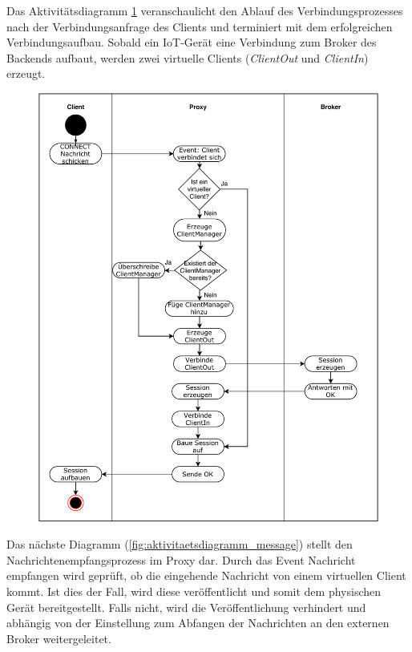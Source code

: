     Das Aktivitätsdiagramm \ref{fig:aktivitaetsdiagramm_connect} veranschaulicht den Ablauf des Verbindungsprozesses nach der Verbindungsanfrage des Clients und terminiert mit dem erfolgreichen Verbindungsaufbau.
    Sobald ein \ac{IoT}-Gerät eine Verbindung zum Broker des Backends aufbaut, werden zwei virtuelle Clients (\emph{ClientOut} und \emph{ClientIn}) erzeugt.
    
    \begin{figure}[!h]%
        \centering
        \includegraphics[width=14cm]{tex/bilder/4_konzept/Activity_Connect.pdf}
        \label{fig:aktivitaetsdiagramm_connect}
    \end{figure}
    \newpage
    Das nächste Diagramm (\ref{fig:aktivitaetsdiagramm_message}) stellt den Nachrichtenempfangsprozess im Proxy dar.
    Durch das Event \glqq Nachricht empfangen\grqq{} wird geprüft, ob die eingehende Nachricht von einem virtuellen Client kommt. Ist dies der Fall, wird diese veröffentlicht und somit dem physischen Gerät bereitgestellt. Falls nicht, wird die Veröffentlichung verhindert und abhängig von der Einstellung zum Abfangen der Nachrichten an den externen Broker weitergeleitet.
    
